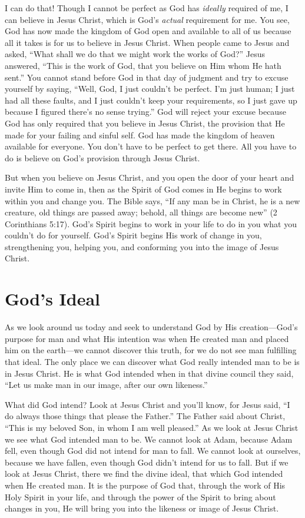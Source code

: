 I can do that! Though I cannot be perfect as God has
\emph{ideally} required of me, I can believe in Jesus Christ, which
is God’s \emph{actual} requirement for me. You see, God has now
made the kingdom of God open and available to all of us
because all it takes is for us to believe in Jesus Christ. When
people came to Jesus and asked, “What shall we do that we
might work the works of God?” Jesus answered, “This is the
work of God, that you believe on Him whom He hath sent.”
You cannot stand before God in that day of judgment and
try to excuse yourself by saying, “Well, God, I just couldn’t
be perfect. I’m just human; I just had all these faults, and
I just couldn’t keep your requirements, so I just gave up
because I figured there’s no sense trying.” God will reject
your excuse because God has only required that you believe
in Jesus Christ, the provision that He made for your failing
and sinful self. God has made the kingdom of heaven available
for everyone. You don’t have to be perfect to get there.
All you have to do is believe on God’s provision through
Jesus Christ.

But when you believe on Jesus Christ, and you open the
door of your heart and invite Him to come in, then as the
Spirit of God comes in He begins to work within you and
change you. The Bible says, “If any man be in Christ, he
is a new creature, old things are passed away; behold, all
things are become new” (2 Corinthians 5:17). God’s Spirit
begins to work in your life to do in you what you couldn’t
do for yourself. God’s Spirit begins His work of change in
you, strengthening you, helping you, and conforming you
into the image of Jesus Christ.


\section*{God's Ideal}

As we look around us today and seek to understand
God by His creation—God’s purpose for man and what His
intention was when He created man and placed him on the
earth—we cannot discover this truth, for we do not see man
fulfilling that ideal. The only place we can discover what
God really intended man to be is in Jesus Christ. He is what
God intended when in that divine council they said, “Let us
make man in our image, after our own likeness.”

What did God intend? Look at Jesus Christ and you’ll
know, for Jesus said, “I do always those things that please
the Father.” The Father said about Christ, “This is my
beloved Son, in whom I am well pleased.” As we look at
Jesus Christ we see what God intended man to be. We
cannot look at Adam, because Adam fell, even though God
did not intend for man to fall. We cannot look at ourselves,
because we have fallen, even though God didn’t intend for
us to fall. But if we look at Jesus Christ, there we find the
divine ideal, that which God intended when He created
man. It is the purpose of God that, through the work of His
Holy Spirit in your life, and through the power of the Spirit
to bring about changes in you, He will bring you into the
likeness or image of Jesus Christ.

